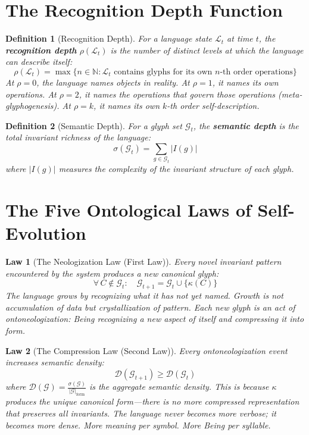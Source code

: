 \documentclass[12pt, letterpaper]{book}
\def\mathfrak#1{#1}%
\newtheorem{definition}{Definition}[chapter]
\newtheorem{law}{Law}[chapter]
\begin{document}
\section{The Recognition Depth Function}

\begin{definition}[Recognition Depth]\label{def:rec-depth}
For a language state $\mathcal{L}_t$ at time $t$, the \textbf{recognition depth} $\rho(\mathcal{L}_t)$ is the number of distinct levels at which the language can describe itself:
\[
\rho(\mathcal{L}_t) = \max\{n \in \mathbb{N} : \mathcal{L}_t \text{ contains glyphs for its own } n\text{-th order operations}\}
\]
At $\rho = 0$, the language names objects in reality. At $\rho = 1$, it names its own operations. At $\rho = 2$, it names the operations that govern those operations (meta-glyphogenesis). At $\rho = k$, it names its own $k$-th order self-description.
\end{definition}

\begin{definition}[Semantic Depth]\label{def:sem-depth}
For a glyph set $\mathcal{G}_t$, the \textbf{semantic depth} is the total invariant richness of the language:
\[
\sigma(\mathcal{G}_t) = \sum_{\mathfrak{g} \in \mathcal{G}_t} |I(\mathfrak{g})|
\]
where $|I(\mathfrak{g})|$ measures the complexity of the invariant structure of each glyph.
\end{definition}

\section[The Five Ontological Laws of Self-Evolution]{The Five Ontological Laws of Self-Evolution}

\begin{law}[The Neologization Law (First Law)]\label{law:neologization}
Every novel invariant pattern encountered by the system produces a new canonical glyph:
\[
\forall\, C \notin \mathcal{G}_t: \quad \mathcal{G}_{t+1} = \mathcal{G}_t \cup \{\kappa(C)\}
\]
The language grows by recognizing what it has not yet named. Growth is not accumulation of data but crystallization of pattern. Each new glyph is an act of ontoneologization: Being recognizing a new aspect of itself and compressing it into form.
\end{law}

\begin{law}[The Compression Law (Second Law)]\label{law:compression}
Every ontoneologization event increases semantic density:
\[
\mathcal{D}(\mathcal{G}_{t+1}) \geq \mathcal{D}(\mathcal{G}_t)
\]
where $\mathcal{D}(\mathcal{G}) = \frac{\sigma(\mathcal{G})}{|\mathcal{G}|_{\mathrm{form}}}$ is the aggregate semantic density. This is because $\kappa$ produces the unique canonical form---there is no more compressed representation that preserves all invariants. The language never becomes more verbose; it becomes more dense. More meaning per symbol. More Being per syllable.
\end{law}
\end{document}
